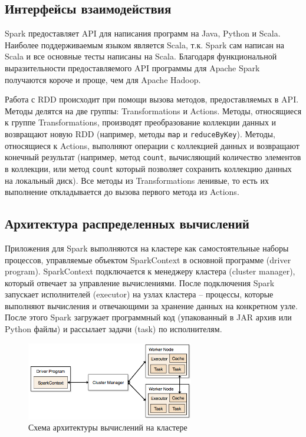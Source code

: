 \documentclass[12pt,a4paper]{report}
\begin{document}
\subsection{Интерфейсы взаимодействия} 

Spark предоставляет API для написания программ на Java, Python и Scala. Наиболее поддерживаемым языком является Scala, т.к. Spark сам написан на Scala и все основные тесты написаны на Scala. Благодаря функциональной выразительности предоставляемого API программы для Apache Spark получаются короче и проще, чем для Apache Hadoop.

Работа с RDD происходит при помощи вызова методов, предоставляемых в API. Методы делятся на две группы: Transformations и Actions. Методы, относящиеся к группе Transformations, производят преобразование коллекции данных и возвращают новую RDD (например, методы \texttt{map} и \texttt{reduceByKey}). Методы, относящиеся к Actions, выполняют операции с коллекцией данных и возвращают конечный результат (например, метод \texttt{count}, вычисляющий количество элементов в коллекции, или метод \texttt{count} который позволяет сохранить коллекцию данных на локальный диск). Все методы из Transformations ленивые, то есть их выполнение откладывается до вызова первого метода из Actions.

\subsection{Архитектура распределенных вычислений} 

Приложения для Spark выполняются на кластере как самостоятельные наборы процессов, управляемые объектом SparkContext в основной программе (driver program). SparkContext подключается к менеджеру кластера (cluster manager), который отвечает за управление вычислениями. После подключения Spark запускает исполнителей (executor) на узлах кластера -- процессы, которые выполняют вычисления и отвечающими за хранение данных на конкретном узле. После этого Spark загружает программный код (упакованный в JAR архив или Python файлы) и рассылает задачи (task) по исполнителям.
\begin{figure}[h]
  \centering
  \includegraphics[width=0.65\textwidth]{cluster-overview.png}
  \caption{Схема архитектуры вычислений на кластере}
  \label{cluster-overview}
\end{figure}
\end{document}
